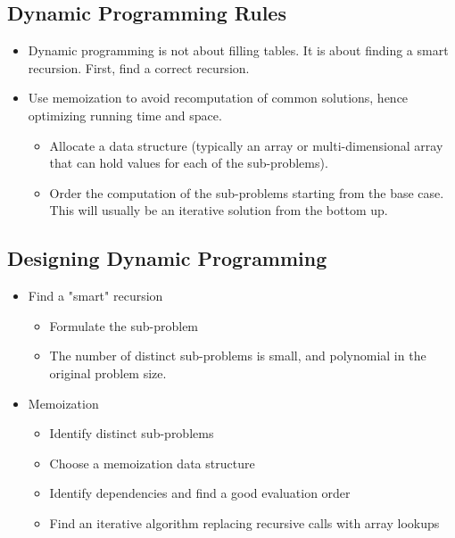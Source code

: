 \subsection{Dynamic Programming Rules}
\begin{itemize}
    \item Dynamic programming is not about filling tables. It is about finding a smart recursion. First, find a correct recursion.
    \item Use memoization to avoid recomputation of common solutions, hence optimizing running time and space.
    \begin{itemize}
        \item Allocate a data structure (typically an array or multi-dimensional array that can hold values for each of the sub-problems).
        \item Order the computation of the sub-problems starting from the base case. This will usually be an iterative solution from the bottom up.
    \end{itemize}
\end{itemize}

\subsection{Designing Dynamic Programming}
\begin{itemize}
    \item Find a "smart" recursion
    \begin{itemize}
        \item Formulate the sub-problem
        \item The number of distinct sub-problems is small, and polynomial in the original problem size.
    \end{itemize}
    \item Memoization
    \begin{itemize}
        \item Identify distinct sub-problems
        \item Choose a memoization data structure
        \item Identify dependencies and find a good evaluation order
        \item Find an iterative algorithm replacing recursive calls with array lookups
    \end{itemize}
\end{itemize}

